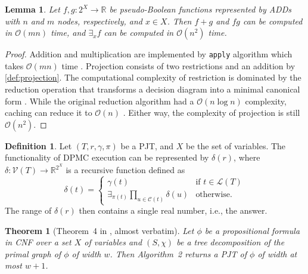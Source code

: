 \documentclass{article}
\newtheorem{theorem}{Theorem}
\newtheorem{lemma}{Lemma}
\theoremstyle{definition}
\newtheorem{definition}{Definition}
\theoremstyle{remark}
\begin{document}
\begin{lemma} \label{lemma:basic_ops}
  Let $f,g\colon 2^X \to \mathbb{R}$ be pseudo-Boolean functions represented by
  ADDs with $n$ and $m$ nodes, respectively, and $x \in X$. Then $f+g$ and $fg$
  can be computed in $\mathcal{O}(mn)$ time, and $\exists_xf$ can be computed in
  $\mathcal{O}(n^2)$ time.
\end{lemma}
\begin{proof}
  Addition and multiplication are implemented by \texttt{apply} algorithm which
  takes $\mathcal{O}(mn)$ time \cite{DBLP:journals/tc/Bryant86}. Projection
  consists of two restrictions and an addition by \cref{def:projection}. The
  computational complexity of restriction is dominated by the reduction
  operation that transforms a decision diagram into a minimal canonical form
  \cite{DBLP:journals/tc/Bryant86}. While the original reduction algorithm had a
  $\mathcal{O}(n \log n)$ complexity, caching can reduce it to $\mathcal{O}(n)$
  \cite{somenzi1998cudd}. Either way, the complexity of projection is still
  $\mathcal{O}(n^2)$.
\end{proof}

\begin{definition} \label{def:abstraction}
  Let $(T, r, \gamma, \pi)$ be a PJT, and $X$ be the set of variables. The
  functionality of \textsc{DPMC} execution can be represented by $\delta(r)$,
  where $\delta\colon \mathcal{V}(T) \to \mathbb{R}^{2^X}$ is a recursive
  function defined as
  \begin{equation} \label{eq:execution}
    \delta(t) =
    \begin{cases}
      \gamma(t) & \text{if } t \in \mathcal{L}(T) \\
      \exists_{\pi(t)} \prod_{u \in \mathcal{C}(t)} \delta(u) & \text{otherwise.}
    \end{cases}
  \end{equation}
  The range of $\delta(r)$ then contains a single real number, i.e., the answer.
\end{definition}

\begin{theorem}[Theorem~4 in \cite{DBLP:conf/cp/DudekPV20}, almost
  verbatim] \label{thm:connection}
  Let $\phi$ be a propositional formula in CNF over a set $X$ of variables and
  $(S, \chi)$ be a tree decomposition of the primal graph of $\phi$ of width
  $w$. Then Algorithm~2 returns a PJT of $\phi$ of width at most $w+1$.
\end{theorem}
\end{document}
